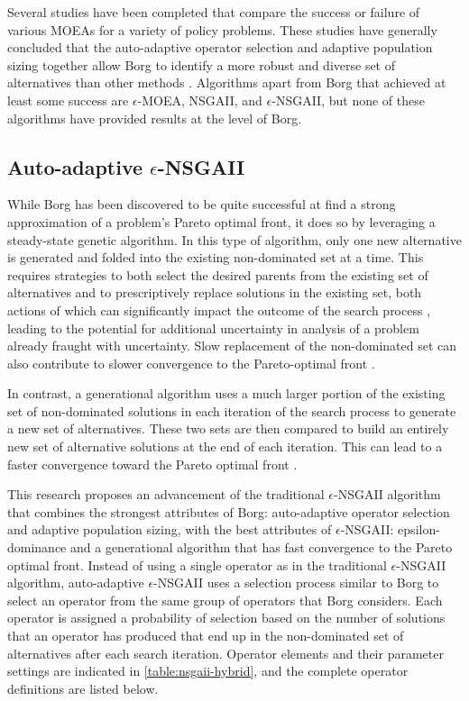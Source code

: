 Several studies have been completed that compare the success or failure of various MOEAs for a variety of policy problems. These studies have generally concluded that the auto-adaptive operator selection and adaptive population sizing together allow Borg to identify a more robust and diverse set of alternatives than other methods \citep{Reed2013, Ward2015, Zheng2016}. Algorithms apart from Borg that achieved at least some success are $\epsilon$-MOEA, NSGAII, and $\epsilon$-NSGAII, but none of these algorithms have provided results at the level of Borg. 

    \subsection{Auto-adaptive $\epsilon$-NSGAII} \label{hybridnsgaii}
    While Borg has been discovered to be quite successful at find a strong approximation of a problem's Pareto optimal front, it does so by leveraging a steady-state genetic algorithm. In this type of algorithm, only one new alternative is generated and folded into the existing non-dominated set at a time. This requires strategies to both select the desired parents from the existing set of alternatives and to prescriptively replace solutions in the existing set, both actions of which can significantly impact the outcome of the search process \citep{Vavak1996}, leading to the potential for additional uncertainty in analysis of a problem already fraught with uncertainty. Slow replacement of the non-dominated set can also contribute to slower convergence to the Pareto-optimal front \citep{Vavak1996}. 
    
    In contrast, a generational algorithm uses a much larger portion of the existing set of non-dominated solutions in each iteration of the search process to generate a new set of alternatives. These two sets are then compared to build an entirely new set of alternative solutions at the end of each iteration. This can lead to a faster convergence toward the Pareto optimal front \citep{Vavak1996}. 
    
    This research proposes an advancement of the traditional $\epsilon$-NSGAII algorithm that combines the strongest attributes of Borg: auto-adaptive operator selection and adaptive population sizing, with the best attributes of $\epsilon$-NSGAII: epsilon-dominance and a generational algorithm that has fast convergence to the Pareto optimal front. Instead of using a single operator as in the traditional $\epsilon$-NSGAII algorithm, auto-adaptive $\epsilon$-NSGAII uses a selection process similar to Borg to select an operator from the same group of operators that Borg considers. Each operator is assigned a probability of selection based on the number of solutions that an operator has produced that end up in the non-dominated set of alternatives after each search iteration. Operator elements and their parameter settings are indicated in \cref{table:nsgaii-hybrid}, and the complete operator definitions are listed below. 

